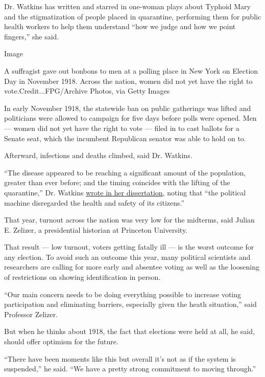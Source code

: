 Dr. Watkins has written and starred in one-woman plays about Typhoid
Mary and the stigmatization of people placed in quarantine, performing
them for public health workers to help them understand ``how we judge
and how we point fingers,'' she said.

Image

A suffragist gave out bonbons to men at a polling place in New York on
Election Day in November 1918. Across the nation, women did not yet have
the right to vote.Credit...FPG/Archive Photos, via Getty Images

In early November 1918, the statewide ban on public gatherings was
lifted and politicians were allowed to campaign for five days before
polls were opened. Men --- women did not yet have the right to vote ---
filed in to cast ballots for a Senate seat, which the incumbent
Republican senator was able to hold on to.

Afterward, infections and deaths climbed, said Dr. Watkins.

``The disease appeared to be reaching a significant amount of the
population, greater than ever before; and the timing coincides with the
lifting of the quarantine,'' Dr. Watkins
\href{https://digitalcommons.unmc.edu/cgi/viewcontent.cgi?referer=https://www.google.com/\&httpsredir=1\&article=1042\&context=etd}{wrote
in her dissertation}, noting that ``the political machine disregarded
the health and safety of its citizens.''

That year, turnout across the nation was very low for the midterms, said
Julian E. Zelizer, a presidential historian at Princeton University.

That result --- low turnout, voters getting fatally ill --- is the worst
outcome for any election. To avoid such an outcome this year, many
political scientists and researchers are calling for more early and
absentee voting as well as the loosening of restrictions on showing
identification in person.

``Our main concern needs to be doing everything possible to increase
voting participation and eliminating barriers, especially given the
heath situation,'' said Professor Zelizer.

But when he thinks about 1918, the fact that elections were held at all,
he said, should offer optimism for the future.

``There have been moments like this but overall it's not as if the
system is suspended,'' he said. ``We have a pretty strong commitment to
moving through.''


